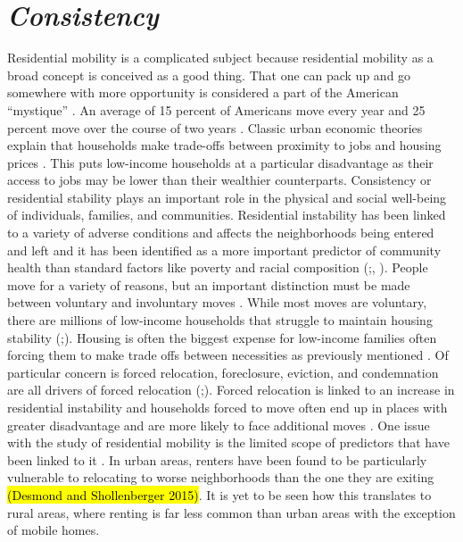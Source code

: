 \section{\textit{Consistency}} 

Residential mobility is a complicated subject because residential mobility as a broad concept is conceived as a good thing. That one can pack up and go somewhere with more opportunity is considered a part of the American “mystique” \citep{molloy_internal_2011}. An average of 15 percent of Americans move every year and 25 percent move over the course of two years \citep{bachmann_ins_2014}. Classic urban economic theories explain that households make trade-offs between proximity to jobs and housing prices \citep{hu_housing_2019}. This puts low-income households at a particular disadvantage as their access to jobs may be lower than their wealthier counterparts. Consistency or residential stability plays an important role in the physical and social well-being of individuals, families, and communities. Residential instability has been linked to a variety of adverse conditions and affects the neighborhoods being entered and left and it has been identified as a more important predictor of community health than standard factors like poverty and racial composition (\citealp{desmond_forced_2015};\citealp{desmond_housing_2016}, \citealp{rauh_housing_2008}). People move for a variety of reasons, but an important distinction must be made between voluntary and involuntary moves \citep{siskar_who_2019}. While most moves are voluntary, there are millions of low-income households that struggle to maintain housing stability (\citealp{phinney_exploring_2013};\citealp{kang_why_2019}). Housing is often the biggest expense for low-income families often forcing them to make trade offs between necessities as previously mentioned \citep{desmond_housing_2015}. Of particular concern is forced relocation, foreclosure, eviction, and condemnation are all drivers of forced relocation (\citealp{phinney_exploring_2013};\citealp{siskar_who_2019}). Forced relocation is linked to an increase in residential instability and households forced to move often end up in places with greater disadvantage and are more likely to face additional moves \citep{desmond_forced_2015}. One issue with the study of residential mobility is the limited scope of predictors that have been linked to it \citep{kang_why_2019}. In urban areas, renters have been found to be particularly vulnerable to relocating to worse neighborhoods than the one they are exiting \hl{(Desmond and Shollenberger 2015)}. It is yet to be seen how this translates to rural areas, where renting is far less common than urban areas with the exception of mobile homes. 

